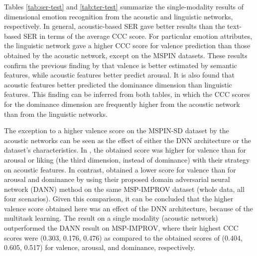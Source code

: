Tables \ref{tab:ser-test} and \ref{tab:ter-test} summarize the single-modality
results of dimensional emotion recognition from the acoustic and linguistic
networks, respectively. In general, acoustic-based SER gave better results than
the text-based SER in terms of the average CCC score. For particular emotion
attributes, the linguistic network gave a higher CCC score for valence
prediction than those obtained by the acoustic network, except on the MSPIN
datasets. These results confirm the previous finding by \cite{Karadogan2012}
that valence is better estimated by semantic features, while acoustic features
better predict arousal. It is also found that acoustic features better
predicted the dominance dimension than linguistic features. This finding can be
inferred from both tables, in which the CCC scores for the dominance dimension
are frequently higher from the acoustic network than from the linguistic
networks.

The exception to a higher valence score on the MSPIN-SD dataset by the acoustic
networks can be seen as the effect of either the DNN architecture or the
dataset's characteristics. In \cite{chen2017multimodal}, the obtained score was
higher for valence than for arousal or liking (the third dimension, instead of
dominance) with their strategy on acoustic features. In contrast,
\cite{Abdelwahab2018} obtained a lower score for valence than for arousal and
dominance by using their proposed domain adversarial neural network (DANN)
method on the same MSP-IMPROV dataset (whole data, all four scenarios). Given
this comparison, it can be concluded that the higher valence score obtained
here was an effect of the DNN architecture, because of the multitask learning.
The result on a single modality (acoustic network) outperformed the DANN result
on MSP-IMPROV, where their highest CCC scores were (0.303, 0.176, 0.476) as
compared to the obtained scores of (0.404, 0.605, 0.517) for valence, arousal,
and dominance, respectively.

